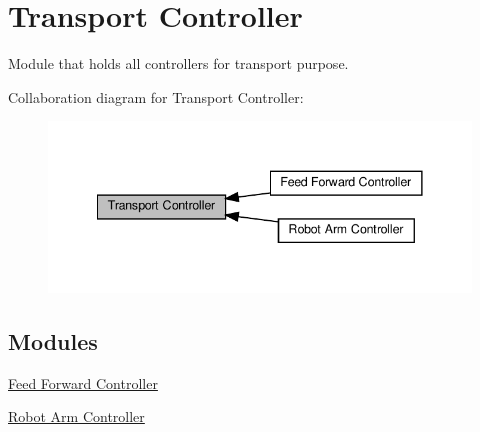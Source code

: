 \hypertarget{group__transport__controller}{}\section{Transport Controller}
\label{group__transport__controller}


Module that holds all controllers for transport purpose.  


Collaboration diagram for Transport Controller\+:\nopagebreak
\begin{figure}[H]
\begin{center}
\leavevmode
\includegraphics[width=341pt]{d3/d47/group__transport__controller}
\end{center}
\end{figure}
\subsection*{Modules}
\begin{DoxyCompactItemize}
\item 
\hyperlink{group__group__feed__forward}{Feed Forward Controller}
\item 
\hyperlink{group__group__arm__controller}{Robot Arm Controller}
\end{DoxyCompactItemize}
